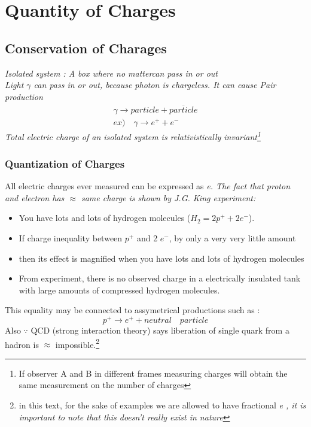 \documentclass[12 pt , twoside, letterpaper] {article}
\begin{document}
\section{Quantity of Charges}
\subsection{Conservation of Charages}
\it Isolated system \rm : A box where no \it matter\rm can pass in or out
\\Light $\gamma$ can pass in or out, because photon is chargeless. It can cause Pair production
\begin{align}
\gamma \rightarrow particle + \overline{particle} \\
ex) \quad  \gamma \rightarrow e^+ +e^-
\end{align}
Total electric charge of an isolated system is \it relativistically invariant\rm \footnote{ If observer A and B in different frames measuring charges will obtain the same measurement on the number of charges}

\subsubsection{Quantization of Charges}
All electric charges ever measured can be expressed as \it e\rm. The fact that proton and electron has $\approx$ same charge is shown by J.G. King experiment:
\begin{itemize}
\item You have lots and lots of hydrogen molecules ($H_2=2 p^+ +2 e^-$).
\item If charge inequality between $p^+$ and 2 $e^-$, by only a very very little amount 
\item then its effect is magnified when you have lots and lots of hydrogen molecules
\item From experiment, there is no observed charge in a electrically insulated tank with large amounts of compressed hydrogen molecules. 
\end {itemize}


This equality may be connected to assymetrical productions such as :
$$ p^+ \rightarrow e^+ + neutral \quad particle$$
Also $\because$ QCD (strong interaction theory) says liberation of single quark from a hadron is $\approx $ impossible.\footnote {in this text, for the sake of examples we are allowed to have fractional \it e \rm, it is important to note that this doesn't really exist in nature}
\end{document}
